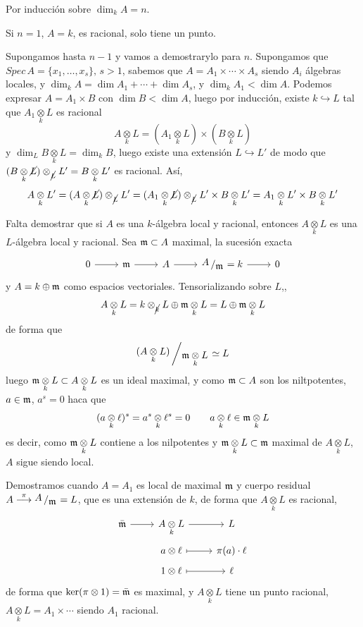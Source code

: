 \begin{dem}
    Por inducci\'on sobre $\dim_k A=n$. 

    Si $n=1$, $A=k$, es racional, solo tiene un punto. 

    Supongamos hasta $n-1$ y vamos a demostrarylo para $n$. Supongamos que $Spec\, A=\{x_1, \ldots, x_s\}, \, s>1$, sabemos que $A = A_1 \times \cdots\times A_s$ siendo $A_i$ \'algebras locales, y $\dim_kA = \dim A_1 + \cdots  + \dim A_s$, y $\dim _k A_1 < \dim A$. Podemos expresar $A = A_1 \times B$ con $\dim B< \dim A$, luego por inducci\'on, existe $k \hookrightarrow L$ tal que $A_1 \underset{k}{\otimes} L$ es racional
    $$A \underset{k}{\otimes} L = (A_1 \underset{k}{\otimes} L) \times (B \underset{k}{\otimes} L)$$
    y $\dim_L B \underset{k}{\otimes} L = \dim_k B$, luego existe una extensi\'on $L \hookrightarrow L'$ de modo que $(B \underset{k}{\otimes} \cancel{L} )\otimes_{\cancel{L}} L' = B \underset{k}{\otimes} L'$ es racional. As\'i, 
    $$A \underset{k}{\otimes} L ' = (A \underset{k}{\otimes} \cancel{L} )\otimes_{\cancel{L}} L' = (A_1 \underset{k}{\otimes} \cancel{L} )\otimes_{\cancel{L}} L' \times B \underset{k}{\otimes} L' = A_1 \underset{k}{\otimes} L' \times B \underset{k}{\otimes} L'$$

    Falta demostrar que si $A$ es una $k$-\'algebra local y racional, entonces $A  \underset{k}{\otimes} L$ es una $L$-\'algebra local y racional. Sea $\mathfrak{m} \subset A$ maximal, la sucesi\'on exacta
    $$\bt 0 \rar & \m \rar & A \rar & \modulo{A}{\m}=k \rar & 0 \et$$
    y $A=k \oplus \mathfrak{m}$ como espacios vectoriales. Tensorializando sobre $L$,,
    $$A \underset{k}{\otimes} L = k \otimes_{\cancel k} L \oplus \mathfrak{m} \underset{k}{\otimes} L = L \oplus \mathfrak{m} \underset{k}{\otimes} L $$
    de forma que 
    $$\modulo{(A \underset{k}{\otimes} L )}{\m \underset{k}{\otimes} L} \simeq L$$ luego $\mathfrak{m} \underset{k}{\otimes} L\subset A \underset{k}{\otimes} L$ es un ideal maximal, y como $\mathfrak{m} \subset A$ son los niltpotentes, $a\in \mathfrak{m}$, $a^s = 0 $ haca que 
    $$(a\underset{k}{\otimes}\ell)^s = a^s \underset{k}{\otimes} \ell^s =0 \qquad  a \underset{k}{\otimes} \ell\in \mathfrak{m} \underset{k}{\otimes} L$$
    es decir, como $\mathfrak{m} \underset{k}{\otimes} L$ contiene a los nilpotentes y $\mathfrak{m} \underset{k}{\otimes} L \subset \mathfrak{m}$ maximal de $A \underset{k}{\otimes} L$, $A$ sigue siendo local.

    Demostramos cuando $A=A_1$ es local de maximal $\mathfrak{m}$ y cuerpo residual $A \overset{\pi}{\longrightarrow}\modulo{A}{\m}=L$, que es una extensi\'on de $k$, de forma que $A \underset{k}{\otimes} L$ es racional, 
    $$\bt \bar \m \rar & A \underset{k}{\otimes} L \rar & L \\[-5mm] & a\otimes \ell \rarmaps & \pi(a) \cdot \ell \\[-5mm] & 1\otimes \ell \rarmaps & \ell \et$$
    de forma que $\ker(\pi \otimes 1)=\bar {\mathfrak{m}}$ es maximal, y $A \underset{k}{\otimes} L$ tiene un punto racional, $A \underset{k}{\otimes} L = A_1\times \cdots $ siendo $A_1$ racional.
\end{dem}
